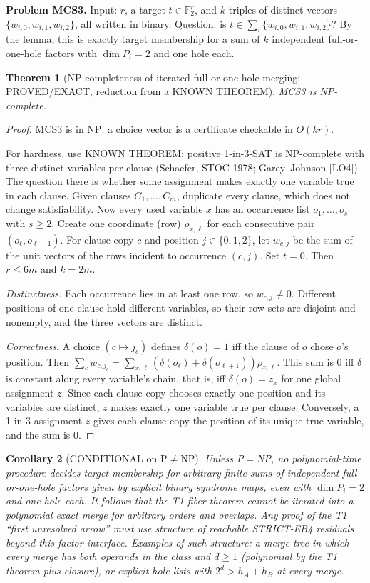 \documentclass[11pt]{article}
\newtheorem{theorem}{Theorem}
\newtheorem{corollary}[theorem]{Corollary}
\newcommand{\F}{\mathbb{F}_2}
\begin{document}
\noindent\textbf{Problem MCS3.} Input: $r$, a target $t\in\F^r$, and $k$ triples of distinct vectors $\{w_{i,0},w_{i,1},w_{i,2}\}$, all written in binary. Question: is $t\in\sum_i\{w_{i,0},w_{i,1},w_{i,2}\}$? By the lemma, this is exactly target membership for a sum of $k$ independent full-or-one-hole factors with $\dim P_i=2$ and one hole each.

\begin{theorem}[NP-completeness of iterated full-or-one-hole merging; PROVED/EXACT, reduction from a KNOWN THEOREM]
MCS3 is NP-complete.
\end{theorem}
\begin{proof}
MCS3 is in NP: a choice vector is a certificate checkable in $O(kr)$.

For hardness, use KNOWN THEOREM: positive 1-in-3-SAT is NP-complete with three distinct variables per clause (Schaefer, STOC 1978; Garey--Johnson [LO4]). The question there is whether some assignment makes exactly one variable true in each clause. Given clauses $C_1,\dots,C_m$, duplicate every clause, which does not change satisfiability. Now every used variable $x$ has an occurrence list $o_1,\dots,o_s$ with $s\ge2$. Create one coordinate (row) $\rho_{x,\ell}$ for each consecutive pair $(o_\ell,o_{\ell+1})$. For clause copy $c$ and position $j\in\{0,1,2\}$, let $w_{c,j}$ be the sum of the unit vectors of the rows incident to occurrence $(c,j)$. Set $t=0$. Then $r\le 6m$ and $k=2m$.

\emph{Distinctness.} Each occurrence lies in at least one row, so $w_{c,j}\neq0$. Different positions of one clause hold different variables, so their row sets are disjoint and nonempty, and the three vectors are distinct.

\emph{Correctness.} A choice $(c\mapsto j_c)$ defines $\delta(o)=1$ iff the clause of $o$ chose $o$'s position. Then $\sum_c w_{c,j_c}=\sum_{x,\ell}(\delta(o_\ell)+\delta(o_{\ell+1}))\rho_{x,\ell}$. This sum is $0$ iff $\delta$ is constant along every variable's chain, that is, iff $\delta(o)=z_x$ for one global assignment $z$. Since each clause copy chooses exactly one position and its variables are distinct, $z$ makes exactly one variable true per clause. Conversely, a 1-in-3 assignment $z$ gives each clause copy the position of its unique true variable, and the sum is $0$.
\end{proof}

\begin{corollary}[CONDITIONAL on P$\neq$NP]
Unless P$=$NP, no polynomial-time procedure decides target membership for arbitrary finite sums of independent full-or-one-hole factors given by explicit binary syndrome maps, even with $\dim P_i=2$ and one hole each. It follows that the T1 fiber theorem cannot be iterated into a polynomial exact merge for arbitrary orders and overlaps. Any proof of the T1 ``first unresolved arrow'' must use structure of \emph{reachable STRICT-EB4 residuals} beyond this factor interface. Examples of such structure: a merge tree in which every merge has both operands in the class and $d\ge1$ (polynomial by the T1 theorem plus closure), or explicit hole lists with $2^d>h_A+h_B$ at every merge.
\end{corollary}
\end{document}
